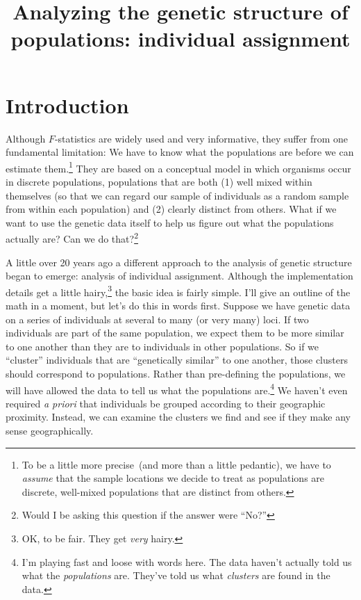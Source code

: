 \documentclass[12pt]{article}
\title{Analyzing the genetic structure of populations: individual assignment}
\begin{document}
\maketitle

\thispagestyle{first}

\section*{Introduction}

Although $F$-statistics are widely used and very informative, they
suffer from one fundamental limitation: We have to know what the
populations are before we can estimate them.\footnote{To be a little
  more precise~(and more than a little pedantic), we have to {\it
    assume\/} that the sample locations we decide to treat as
  populations are discrete, well-mixed populations that are distinct
  from others.} They are based on a conceptual model in which
organisms occur in discrete populations, populations that are both (1)
well mixed within themselves (so that we can regard our sample of
individuals as a random sample from within each population) and (2)
clearly distinct from others. What if we want to use the genetic data
itself to help us figure out what the populations actually are? Can we
do that?\footnote{Would I be asking this question if the answer were
  ``No?''}

A little over 20 years ago a different approach to the analysis of
genetic structure began to emerge: analysis of individual
assignment. Although the implementation
details get a little hairy,\footnote{OK, to be fair. They get {\it
    very\/} hairy.} the basic idea is fairly simple. I'll give an
outline of the math in a moment, but let's do this in words
first. Suppose we have genetic data on a series of individuals at
several to many (or very many) loci. If two individuals are part of
the same population, we expect them to be more similar to one another
than they are to individuals in other populations. So if we
``cluster'' individuals that are ``genetically similar'' to one
another, those clusters should correspond to populations. Rather than
pre-defining the populations, we will have allowed the data to tell us
what the populations are.\footnote{I'm playing fast and loose with
  words here. The data haven't actually told us what the {\it
    populations\/} are. They've told us what {\it clusters\/} are
  found in the data.} We haven't even required {\it a priori\/} that
individuals be grouped according to their geographic
proximity. Instead, we can examine the clusters we find and see if
they make any sense geographically.
\end{document}

